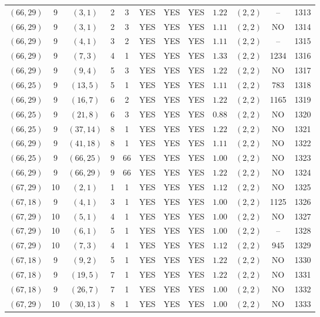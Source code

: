 \begin{longtable}{|c|c|c|c|c|c|c|c|c|c|c|c|}
$(66,29)$ & 9 & $(3,1)$ & 2 & 3 & YES & YES & YES & $1.22$ & $(2,2)$ & -- & 1313\\
$(66,29)$ & 9 & $(3,1)$ & 2 & 3 & YES & YES & YES & $1.11$ & $(2,2)$ & NO & 1314\\
$(66,29)$ & 9 & $(4,1)$ & 3 & 2 & YES & YES & YES & $1.11$ & $(2,2)$ & -- & 1315\\
$(66,29)$ & 9 & $(7,3)$ & 4 & 1 & YES & YES & YES & $1.33$ & $(2,2)$ & 1234 & 1316\\
$(66,29)$ & 9 & $(9,4)$ & 5 & 3 & YES & YES & YES & $1.22$ & $(2,2)$ & NO & 1317\\
$(66,25)$ & 9 & $(13,5)$ & 5 & 1 & YES & YES & YES & $1.11$ & $(2,2)$ & 783 & 1318\\
$(66,29)$ & 9 & $(16,7)$ & 6 & 2 & YES & YES & YES & $1.22$ & $(2,2)$ & 1165 & 1319\\
$(66,25)$ & 9 & $(21,8)$ & 6 & 3 & YES & YES & YES & $0.88$ & $(2,2)$ & NO & 1320\\
$(66,25)$ & 9 & $(37,14)$ & 8 & 1 & YES & YES & YES & $1.22$ & $(2,2)$ & NO & 1321\\
$(66,29)$ & 9 & $(41,18)$ & 8 & 1 & YES & YES & YES & $1.11$ & $(2,2)$ & NO & 1322\\
$(66,25)$ & 9 & $(66,25)$ & 9 & 66 & YES & YES & YES & $1.00$ & $(2,2)$ & NO & 1323\\
$(66,29)$ & 9 & $(66,29)$ & 9 & 66 & YES & YES & YES & $1.22$ & $(2,2)$ & NO & 1324\\
$(67,29)$ & 10 & $(2,1)$ & 1 & 1 & YES & YES & YES & $1.12$ & $(2,2)$ & NO & 1325\\
$(67,18)$ & 9 & $(4,1)$ & 3 & 1 & YES & YES & YES & $1.00$ & $(2,2)$ & 1125 & 1326\\
$(67,29)$ & 10 & $(5,1)$ & 4 & 1 & YES & YES & YES & $1.00$ & $(2,2)$ & NO & 1327\\
$(67,29)$ & 10 & $(6,1)$ & 5 & 1 & YES & YES & YES & $1.00$ & $(2,2)$ & -- & 1328\\
$(67,29)$ & 10 & $(7,3)$ & 4 & 1 & YES & YES & YES & $1.12$ & $(2,2)$ & 945 & 1329\\
$(67,18)$ & 9 & $(9,2)$ & 5 & 1 & YES & YES & YES & $1.22$ & $(2,2)$ & NO & 1330\\
$(67,18)$ & 9 & $(19,5)$ & 7 & 1 & YES & YES & YES & $1.22$ & $(2,2)$ & NO & 1331\\
$(67,18)$ & 9 & $(26,7)$ & 7 & 1 & YES & YES & YES & $1.00$ & $(2,2)$ & NO & 1332\\
$(67,29)$ & 10 & $(30,13)$ & 8 & 1 & YES & YES & YES & $1.00$ & $(2,2)$ & NO & 1333\\

\end{longtable}
